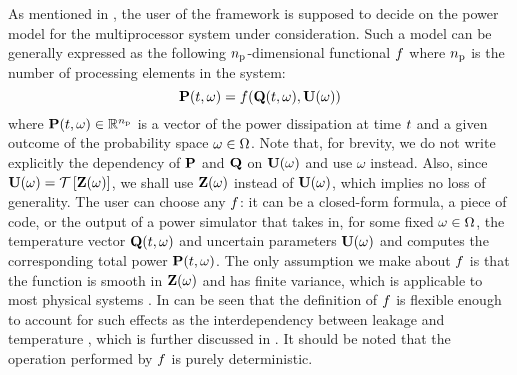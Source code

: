 As mentioned in , the user of the framework is supposed to decide on the power model for the multiprocessor system under consideration.
Such a model can be generally expressed as the following ${n_\text{p}}$-dimensional functional $f$ where ${n_\text{p}}$ is the number of processing elements in the system:
\begin{equation} \elabel{power-model}
  \vP(\t, \o) = \f(\vTO(\t, \o), \vU(\o))
\end{equation}
where $\mathbf{P}(t, \omega) \in \mathbb{R}^{n_\text{p}}$ is a vector of the power dissipation at time $t$ and a given outcome of the probability space $\omega \in \Omega$.
Note that, for brevity, we do not write explicitly the dependency of $\mathbf{P}$ and $\mathbf{Q}$ on $\mathbf{U}(\omega)$ and use $\omega$ instead.
Also, since $\vU(\o) = \oTransform{\vZ(\o)}$, we shall use $\mathbf{Z}(\omega)$ instead of $\mathbf{U}(\omega)$, which implies no loss of generality.
The user can choose any $f$: it can be a closed-form formula, a piece of code, or the output of a power simulator that takes in, for some fixed $\omega \in \Omega$, the temperature vector $\mathbf{Q}(t, \omega)$ and uncertain parameters $\mathbf{U}(\omega)$ and computes the corresponding total power $\mathbf{P}(t, \omega)$.
The only assumption we make about $f$ is that the function is smooth in $\mathbf{Z}(\omega)$ and has finite variance, which is applicable to most physical systems \cite{xiu2010}.
In can be seen that the definition of $f$ is flexible enough to account for such effects as the interdependency between leakage and temperature \cite{srivastava2010, liu2007}, which is further discussed in .
It should be noted that the operation performed by $f$ is purely deterministic.
